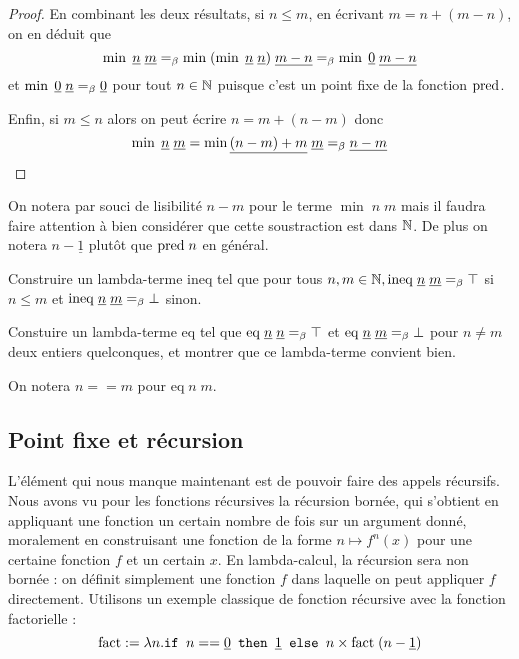 \begin{proof}
    En combinant les deux résultats, si $n \leq m$, en écrivant $m = n+(m-n)$, on en déduit que $$\min\;\underline n\;\underline m =_\beta \min\;(\min\;\underline n\;\underline n)\;\underline{m-n} =_\beta \min \;\underline 0\; \underline{m-n}$$ et $\min \;\underline 0\;\underline n =_\beta \underline 0$ pour tout $n\in\mathbb{N}$ puisque c'est un point fixe de la fonction $\mathrm{pred}$.

    Enfin, si $m\leq n$ alors on peut écrire $n = m+(n-m)$ donc $$\min\;\underline n\;\underline m = \min \underline{(n-m)+m}\;\underline m =_\beta \underline{n-m}$$
\end{proof}

On notera par souci de lisibilité $n-m$ pour le terme $\min\;n\;m$ mais il faudra faire attention à bien considérer que cette soustraction est dans $\mathbb{N}$. De plus on notera $n-\underline 1$ plutôt que $\mathrm{pred}\;n$ en général.

\begin{exo}[Inégalité]
    Construire un lambda-terme $\mathrm{ineq}$ tel que pour tous $n,m\in\mathbb{N},\mathrm{ineq}\;\underline n\;\underline m =_\beta \top$ si $n\leq m$ et $\mathrm{ineq}\;\underline n\;\underline m =_\beta \bot$ sinon.
\end{exo}

\begin{exo}[\'Egalité]
    Constuire un lambda-terme $\mathrm{eq}$ tel que $\mathrm{eq}\;\underline n\;\underline n =_\beta \top$ et $\mathrm{eq}\;\underline n\;\underline m=_\beta \bot$ pour $n\neq m$ deux entiers quelconques, et montrer que ce lambda-terme convient bien.
\end{exo}

On notera $n==m$ pour $\mathrm{eq}\;n\;m$.

\subsection{Point fixe et récursion}

L'élément qui nous manque maintenant est de pouvoir faire des appels récursifs. Nous avons vu pour les fonctions récursives la récursion bornée, qui s'obtient en appliquant une fonction un certain nombre de fois sur un argument donné, moralement en construisant une fonction de la forme $n\mapsto f^n(x)$ pour une certaine fonction $f$ et un certain $x$. En lambda-calcul, la récursion sera non bornée : on définit simplement une fonction $f$ dans laquelle on peut appliquer $f$ directement. Utilisons un exemple classique de fonction récursive avec la fonction factorielle : $$\mathrm{fact} := \lambda n.\texttt{if } n == \underline 0 \texttt{ then } \underline 1\texttt{ else }n\times \mathrm{fact}\;(n-\underline 1)$$

